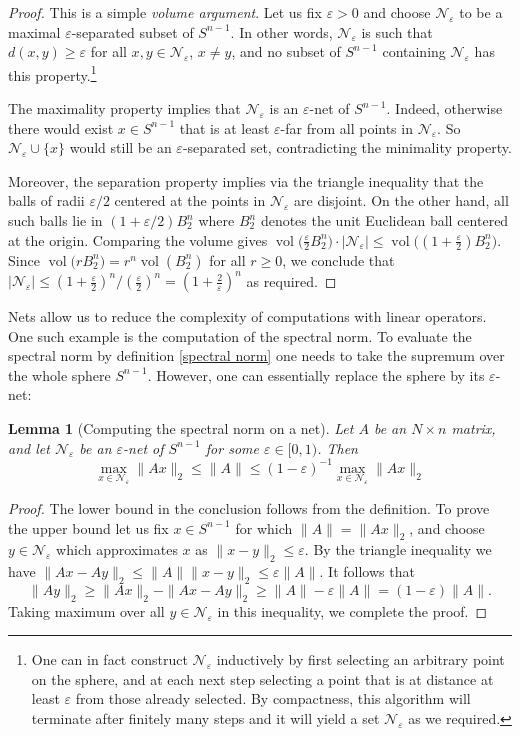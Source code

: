 \documentclass[10pt, openany]{book}
\newtheorem{lemma}[theorem]{Lemma}
\theoremstyle{remark}
\DeclareMathOperator{\vol}{vol}
\def \NN {\mathcal{N}}
\def \e {\varepsilon}
\begin{document}
\begin{proof}
This is a simple {\em volume argument}.
Let us fix $\e>0$ and choose $\NN_\e$ to be a maximal $\e$-separated subset of $S^{n-1}$.
In other words, $\NN_\e$ is such that 
$d(x,y) \ge \e$ for all $x, y \in \NN_\e$, $x \ne y$,
and no subset of $S^{n-1}$ containing $\NN_\e$ has this property.\footnote{One 
can in fact construct $\NN_\e$ inductively by first selecting an arbitrary 
point on the sphere, and at each next step selecting a point that is at distance at least $\e$
from those already selected. By compactness, this algorithm will terminate after finitely 
many steps and it will yield a set $\NN_\e$ as we required.}

The maximality property implies that $\NN_\e$ is an $\e$-net of $S^{n-1}$. Indeed, 
otherwise there would exist  $x \in S^{n-1}$ that is at least $\e$-far from all points in $\NN_\e$.
So $\NN_\e \cup \{x\}$ would still be an $\e$-separated set, contradicting the minimality property.

Moreover, the separation property implies via the triangle inequality that the balls of radii $\e/2$ 
centered at the points in $\NN_\e$ are disjoint. On the other hand, all such balls lie in
$(1+\e/2) B_2^n$ where $B_2^n$ denotes the unit Euclidean ball centered at the origin. 
Comparing the volume gives
$\vol \big( \frac{\e}{2} B_2^n \big) \cdot |\NN_\e|
\le \vol \big( (1 + \frac{\e}{2}) B_2^n \big)$.
Since $\vol \big( r B_2^n \big) = r^n \vol(B_2^n)$ for all $r \ge 0$, we conclude that 
$|\NN_\e| \le (1+\frac{\e}{2})^n / (\frac{\e}{2})^n = (1+\frac{2}{\e})^n$
as required.
\end{proof}

Nets allow us to reduce the complexity of computations with linear operators. 
One such example is the computation of the spectral norm. To evaluate the 
spectral norm by definition \eqref{spectral norm} one needs to take the supremum 
over the whole sphere $S^{n-1}$. However, one can essentially replace
the sphere by its $\e$-net:

\begin{lemma}[Computing the spectral norm on a net]  \label{norm on net general}
  Let $A$ be an $N \times n$ matrix,
  and let $\NN_\e$ be an $\e$-net of  $S^{n-1}$
  for some $\e \in [0,1)$. Then 
  $$
  \max_{x \in \NN_\e} \|Ax\|_2 \le \|A\| \le (1 - \e)^{-1} \max_{x \in \NN_\e} \|Ax\|_2
  $$  
\end{lemma}

\begin{proof}
The lower bound in the conclusion follows from the definition. To prove the upper bound
let us fix $x \in S^{n-1}$ for which $\|A\| = \|Ax\|_2$, and choose $y \in \NN_\e$ 
which approximates $x$ as $\|x-y\|_2 \le \e$. By the triangle inequality we have
$\|Ax-Ay\|_2 \le \|A\| \|x-y\|_2 \le \e \|A\|$.
It follows that 
$$
\|Ay\|_2 \ge \|Ax\|_2 - \|Ax-Ay\|_2
\ge \|A\| - \e\|A\| = (1-\e)\|A\|.
$$
Taking maximum over all $y \in \NN_\e$ in this inequality, we complete the proof.
\end{proof}
\end{document}
